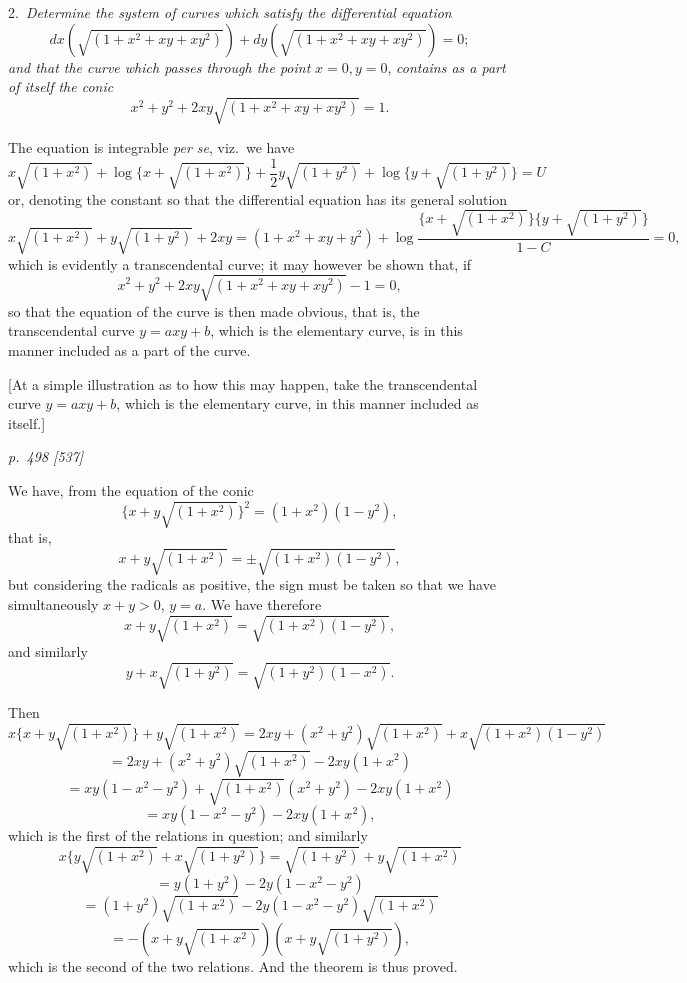 \documentclass[11pt,a4paper]{book}
\begin{document}
\smallskip
\noindent\textsc{2.}\, \textit{Determine the system of curves which satisfy the differential equation}
\[
dx(\sqrt{(1 + x^2 + xy + xy^2)}) + dy(\sqrt{(1 + x^2 + xy + xy^2)}) = 0;
\]
\textit{and that the curve which passes through the point} $x = 0, y = 0$, \textit{contains as a part
of itself the conic}
\[
x^2 + y^2 + 2xy\sqrt{(1 + x^2 + xy + xy^2)} = 1.
\]

The equation is integrable \textit{per se}, viz.\ we have
\[
x\sqrt{(1 + x^2)} + \log\{x + \sqrt{(1 + x^2)}\} + \frac{1}{2}y\sqrt{(1 + y^2)} + \log\{y + \sqrt{(1 + y^2)}\} = U
\]
or, denoting the constant so that the differential equation has its general solution
\[
x\sqrt{(1 + x^2)} + y\sqrt{(1 + y^2)} + 2xy = (1 + x^2 + xy + y^2) + \log\frac{\{x + \sqrt{(1 + x^2)}\}\{y + \sqrt{(1 + y^2)}\}}{1 - C} = 0,
\]
which is evidently a transcendental curve; it may however be shown that, if
\[
x^2 + y^2 + 2xy\sqrt{(1 + x^2 + xy + xy^2)} - 1 = 0,
\]
so that the equation of the curve is then made obvious, that is, the transcendental
curve $y = a x y + b$, which is the elementary curve, is in this manner included as a part of the curve.

[At a simple illustration as to how this may happen, take the transcendental
curve $y = a x y + b$, which is the elementary curve, in this manner included as itself.]

\clearpage

\bigskip
\textit{p.~498 [537]}
\smallskip

We have, from the equation of the conic
\[
\{x + y\sqrt{(1 + x^2)}\}^2 = (1 + x^2)(1 - y^2),
\]
that is,
\[
x + y\sqrt{(1 + x^2)} = \pm\sqrt{(1 + x^2)(1 - y^2)},
\]
but considering the radicals as positive, the sign must be taken so that we have
simultaneously $x + y > 0$, $y = a$. We have therefore
\[
x + y\sqrt{(1 + x^2)} = \sqrt{(1 + x^2)(1 - y^2)},
\]
and similarly
\[
y + x\sqrt{(1 + y^2)} = \sqrt{(1 + y^2)(1 - x^2)}.
\]

Then
\[
x\{x + y\sqrt{(1 + x^2)}\} + y\sqrt{(1 + x^2)} = 2xy + (x^2 + y^2)\sqrt{(1 + x^2)} + x\sqrt{(1 + x^2)(1 - y^2)}
\]
\[
=2xy + (x^2 + y^2)\sqrt{(1 + x^2)} - 2xy(1 + x^2)
\]
\[
= xy(1 - x^2 - y^2) + \sqrt{(1 + x^2)}(x^2 + y^2) - 2xy(1 + x^2)
\]
\[
= xy(1 - x^2 - y^2) - 2xy(1 + x^2),
\]
which is the first of the relations in question; and similarly
\[
x\{y\sqrt{(1 + x^2)} + x\sqrt{(1 + y^2)}\} = \sqrt{(1 + y^2)} + y\sqrt{(1 + x^2)}
\]
\[
= y(1 + y^2) - 2y(1 - x^2 - y^2)
\]
\[
=(1 + y^2)\sqrt{(1 + x^2)} - 2y(1 - x^2 - y^2)\sqrt{(1 + x^2)}
\]
\[
= -(x + y\sqrt{(1 + x^2)})(x + y\sqrt{(1 + y^2)}),
\]
which is the second of the two relations. And the theorem is thus proved.
\end{document}
